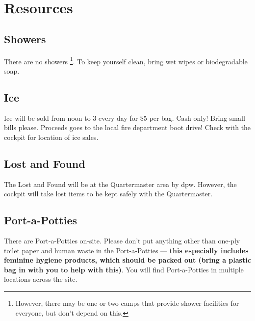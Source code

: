 \newpage
\section*{Resources}

\subsection*{Showers}
There are no showers \footnote{However, there may be one or two camps that provide shower facilities for everyone, but don't depend on this.}. To keep yourself clean, bring wet wipes or biodegradable soap.

\subsection*{Ice}
Ice will be sold from noon to 3 \pm every day for \$5 per bag.  Cash only! Bring small bills please. Proceeds goes to the local fire department boot drive! Check with the \gls{cockpit} for location of ice sales.


\subsection*{Lost and Found}
The Lost and Found will be at the Quartermaster area by \gls{dpw}.  However, the \gls{cockpit} will take lost items to be kept safely with the Quartermaster.

\subsection*{Port-a-Potties}
There are Port-a-Potties on-site. Please don't put anything other than one-ply toilet paper and human waste in the Port-a-Potties --- \textbf{this especially includes feminine hygiene products, which should be packed out (bring a plastic bag in with you to help with this)}. You will find Port-a-Potties in multiple locations across the site.




